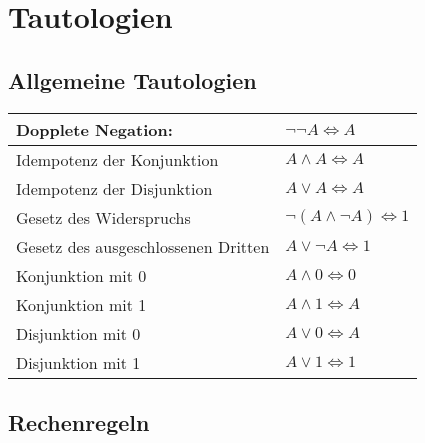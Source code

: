 \documentclass[a4paper, 12pt]{extarticle}
\begin{document}
\section*{Tautologien}

\subsection*{Allgemeine Tautologien}

\begin{tabular}{p{8cm}|p{7cm}}
Dopplete Negation: & $\lnot \lnot A \Leftrightarrow A$\\
\hline
Idempotenz der Konjunktion & $A \land A \Leftrightarrow A$\\
\hline
Idempotenz der Disjunktion & $A \lor A \Leftrightarrow A$\\
\hline
Gesetz des Widerspruchs & $\lnot (A \land \lnot A) \Leftrightarrow 1$\\
\hline
Gesetz des ausgeschlossenen Dritten & $A \lor \lnot A \Leftrightarrow 1$\\
\hline
Konjunktion mit 0 & $A \land 0 \Leftrightarrow 0$\\
\hline
Konjunktion mit 1 & $A \land 1 \Leftrightarrow A$\\
\hline
Disjunktion mit 0 & $A \lor 0 \Leftrightarrow A$\\
\hline
Disjunktion mit 1 & $A \lor 1 \Leftrightarrow 1$
\end{tabular}

\subsection*{Rechenregeln}
\end{document}
